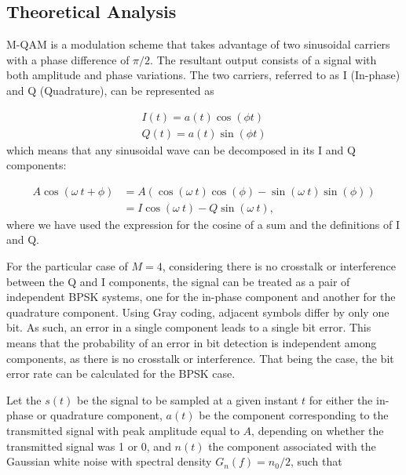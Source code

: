 \begin{refsection}

\subsection{Theoretical Analysis}

M-QAM is a modulation scheme that takes advantage of two sinusoidal carriers with a phase difference of $\pi/2$. The resultant output consists of a signal with both amplitude and phase variations. The two carriers, referred to as I (In-phase) and Q (Quadrature), can be represented as

\begin{align}
	I(t)=a(t)\cos(\phi t) \\
	Q(t)=a(t)\sin(\phi t)
\end{align}
which means that any sinusoidal wave can be decomposed in its I and Q components:

\begin{align}
	A\cos(\omega~t+\phi)&=A\left(\cos(\omega~t)\cos(\phi)-\sin(\omega~t)\sin(\phi)\right) \\
	&=I\cos(\omega~t)-Q\sin(\omega~t),
\end{align}
where we have used the expression for the cosine of a sum and the definitions of I and Q.



For the particular case of $M=4$, considering there is no crosstalk or interference between the Q and I components, the signal can be treated as a pair of independent BPSK systems, one for the in-phase component and another for the quadrature component.
Using Gray coding, adjacent symbols differ by only one bit. As such, an error in a single component leads to a single bit error.
This means that the probability of an error in bit detection is independent among components, as there is no crosstalk or interference. That being the case, the bit error rate can be calculated for the BPSK case.


Let the $s(t)$ be the signal to be sampled at a given instant $t$ for either the in-phase or quadrature component, $a(t)$ be the component corresponding to the transmitted signal with peak amplitude equal to $A$, depending on whether the transmitted signal was 1 or 0, and $n(t)$ the component associated with the Gaussian white noise with spectral density $G_n(f) = n_0/2$, such that


\end{refsection}

